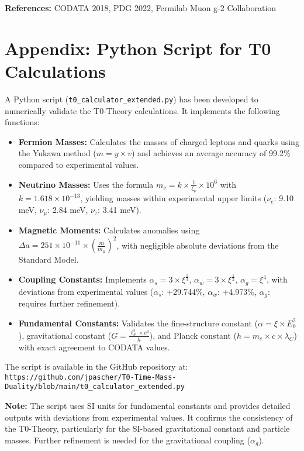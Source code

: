 \documentclass[12pt,a4paper]{article}
\begin{document}
	\textbf{References:} CODATA 2018, PDG 2022, Fermilab Muon g-2 Collaboration
	
	\section{Appendix: Python Script for T0 Calculations}
	
	A Python script (\texttt{t0\_calculator\_extended.py}) has been developed to numerically validate the T0-Theory calculations. It implements the following functions:
	
	\begin{itemize}
		\item \textbf{Fermion Masses:} Calculates the masses of charged leptons and quarks using the Yukawa method (\(m = y \times v\)) and achieves an average accuracy of 99.2\% compared to experimental values.
		\item \textbf{Neutrino Masses:} Uses the formula \(m_{\nu} = k \times \frac{1}{\xi_{\nu}} \times 10^6\) with \(k = 1.618 \times 10^{-13}\), yielding masses within experimental upper limits (\(\nu_e\): 9.10 meV, \(\nu_\mu\): 2.84 meV, \(\nu_\tau\): 3.41 meV).
		\item \textbf{Magnetic Moments:} Calculates anomalies using \(\Delta a = 251 \times 10^{-11} \times \left(\frac{m}{m_{\mu}}\right)^2\), with negligible absolute deviations from the Standard Model.
		\item \textbf{Coupling Constants:} Implements \(\alpha_s = 3 \times \xi^{\frac{1}{3}}\), \(\alpha_w = 3 \times \xi^{\frac{1}{2}}\), \(\alpha_g = \xi^4\), with deviations from experimental values (\(\alpha_s\): +29.744\%, \(\alpha_w\): +4.973\%, \(\alpha_g\): requires further refinement).
		\item \textbf{Fundamental Constants:} Validates the fine-structure constant (\(\alpha = \xi \times E_0^2\)), gravitational constant (\(G = \frac{\ell_P^2 \times c^3}{\hbar}\)), and Planck constant (\(h = m_e \times c \times \lambda_C\)) with exact agreement to CODATA values.
	\end{itemize}
	
	The script is available in the GitHub repository at: \\
	\texttt{https://github.com/jpascher/T0-Time-Mass-Duality/blob/main/t0\_calculator\_extended.py}
	
	\textbf{Note:} The script uses SI units for fundamental constants and provides detailed outputs with deviations from experimental values. It confirms the consistency of the T0-Theory, particularly for the SI-based gravitational constant and particle masses. Further refinement is needed for the gravitational coupling (\(\alpha_g\)).
	
\end{document}
